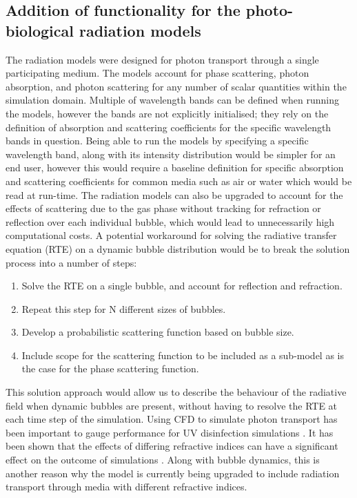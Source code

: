 \subsection{Addition of functionality for the photo-biological radiation models}
The radiation models were designed for photon transport through a single participating medium. The models account for phase scattering, photon absorption, and photon scattering for any number of scalar quantities within the simulation domain. Multiple of wavelength bands can be defined when running the models, however the bands are not explicitly initialised; they rely on the definition of absorption and scattering coefficients for the specific wavelength bands in question. Being able to run the models by specifying a specific wavelength band, along with its intensity distribution would be simpler for an end user, however this would require a baseline definition for specific absorption and scattering coefficients for common media such as air or water which would be read at run-time. 
\skippingparagraph
The radiation models can also be upgraded to account for the effects of scattering due to the gas phase without tracking for refraction or reflection over each individual bubble, which would lead to unnecessarily high computational costs. A potential workaround for solving the radiative transfer equation (RTE) on a dynamic bubble distribution would be to break the solution process into a number of steps:
\begin{enumerate}
    \item Solve the RTE on a single bubble, and account for reflection and refraction.
    \item Repeat this step for N different sizes of bubbles.
    \item Develop a probabilistic scattering function based on bubble size.
    \item Include scope for the scattering function to be included as a sub-model as is the case for the phase scattering function. 
\end{enumerate}
This solution approach would allow us to describe the behaviour of the radiative field when dynamic bubbles are present, without having to resolve the RTE at each time step of the simulation.
\skippingparagraph
Using CFD to simulate photon transport has been important to gauge performance for UV disinfection simulations \cite{crapulli2010}. It has been shown that the effects of differing refractive indices can have a significant effect on the outcome of simulations \cite{ho2009}. Along with bubble dynamics, this is another reason why the model is currently being upgraded to include radiation transport through media with different refractive indices.


